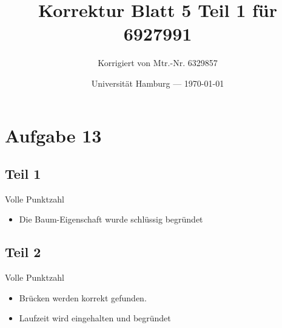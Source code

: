 \documentclass[parskip=half,a4paper]{scrartcl}
\title{Korrektur Blatt 5 Teil 1 für 6927991}
\author{Korrigiert von Mtr.-Nr. 6329857}
\date{Universität Hamburg --- \today}
\begin{document}
\maketitle %

\section{Aufgabe 13}

\subsection{Teil 1}

Volle Punktzahl

\begin{itemize}
    \item Die Baum-Eigenschaft wurde schlüssig begründet
\end{itemize}

\subsection{Teil 2}

Volle Punktzahl

\begin{itemize}
    \item Brücken werden korrekt gefunden.
    \item Laufzeit wird eingehalten und begründet
\end{itemize}
\end{document}

